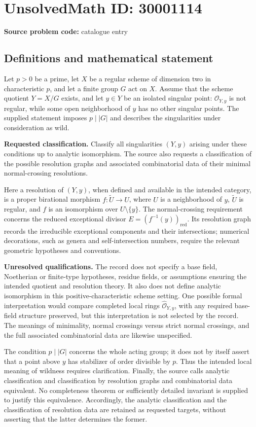 \documentclass[11pt]{article}
\begin{document}
\section*{UnsolvedMath ID: 30001114}
\textbf{Source problem code:} catalogue entry
\subsection{Definitions and mathematical statement}
Let \(p>0\) be a prime, let \(X\) be a regular scheme of dimension two in characteristic \(p\), and let a finite group \(G\) act on \(X\). Assume that the scheme quotient \(Y=X/G\) exists, and let \(y\in Y\) be an isolated singular point: \(\mathcal O_{Y,y}\) is not regular, while some open neighborhood of \(y\) has no other singular points. The supplied statement imposes \(p\mid |G|\) and describes the singularities under consideration as wild.

\textbf{Requested classification.} Classify all singularities \((Y,y)\) arising under these conditions up to analytic isomorphism. The source also requests a classification of the possible resolution graphs and associated combinatorial data of their minimal normal-crossing resolutions.

Here a resolution of \((Y,y)\), when defined and available in the intended category, is a proper birational morphism \(f:\widetilde U\to U\), where \(U\) is a neighborhood of \(y\), \(\widetilde U\) is regular, and \(f\) is an isomorphism over \(U\setminus\{y\}\). The normal-crossing requirement concerns the reduced exceptional divisor \(E=(f^{-1}(y))_{\mathrm{red}}\). Its resolution graph records the irreducible exceptional components and their intersections; numerical decorations, such as genera and self-intersection numbers, require the relevant geometric hypotheses and conventions.

\textbf{Unresolved qualifications.} The record does not specify a base field, Noetherian or finite-type hypotheses, residue fields, or assumptions ensuring the intended quotient and resolution theory. It also does not define analytic isomorphism in this positive-characteristic scheme setting. One possible formal interpretation would compare completed local rings \(\widehat{\mathcal O}_{Y,y}\), with any required base-field structure preserved, but this interpretation is not selected by the record. The meanings of minimality, normal crossings versus strict normal crossings, and the full associated combinatorial data are likewise unspecified.

The condition \(p\mid |G|\) concerns the whole acting group; it does not by itself assert that a point above \(y\) has stabilizer of order divisible by \(p\). Thus the intended local meaning of wildness requires clarification. Finally, the source calls analytic classification and classification by resolution graphs and combinatorial data equivalent. No completeness theorem or sufficiently detailed invariant is supplied to justify this equivalence. Accordingly, the analytic classification and the classification of resolution data are retained as requested targets, without asserting that the latter determines the former.
\end{document}

